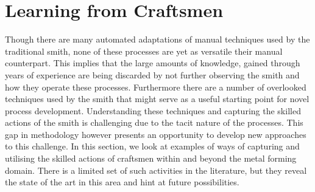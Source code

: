 





\newpage
\section{Learning from Craftsmen} \label{sec:Learning}

Though there are many automated adaptations of manual techniques used by the traditional smith, none of these processes are yet as versatile their manual counterpart. This implies that the large amounts of knowledge, gained through years of experience are being discarded by not further observing the smith and how they operate these processes. Furthermore there are a number of overlooked techniques used by the smith that might serve as a useful starting point for novel process development. Understanding these techniques and capturing the skilled actions of the smith is challenging due to the tacit nature of the processes. This gap in methodology however presents an opportunity to develop new approaches to this challenge. In this section, we look at examples of ways of capturing and utilising the skilled actions of craftsmen within and beyond the metal forming domain. There is a limited set of such activities in the literature, but they reveal the state of the art in this area and hint at future possibilities. 

